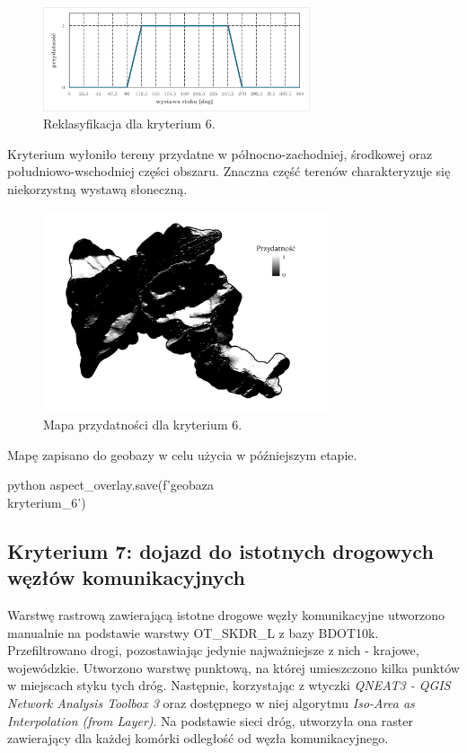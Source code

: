 \documentclass{article}
\begin{document}
\begin{figure}[H]
    \centering
    \includegraphics[width=0.7\textwidth]{img/kryterium6-wykres-glowny.png}
    \caption{Reklasyfikacja dla kryterium 6.}
\end{figure}
\vspace{10pt}

Kryterium wyłoniło tereny przydatne w północno-zachodniej, środkowej oraz południowo-wschodniej części obszaru. Znaczna część terenów charakteryzuje się niekorzystną wystawą słoneczną.
\vspace{5pt}

\begin{figure}[H]
    \centering
    \includegraphics[width=0.75\textwidth]{img/kryterium6-layout.jpg}
    \caption*{Mapa przydatności dla kryterium 6.}
\end{figure}
\vspace{10pt}

Mapę zapisano do geobazy w celu użycia w późniejszym etapie.
\vspace{5pt}

\begin{mintedbox}{python}
aspect_overlay.save(f'{geobaza}\\kryterium_6')
\end{mintedbox}

\newpage
\subsection{Kryterium 7: dojazd do istotnych drogowych węzłów komunikacyjnych}
Warstwę rastrową zawierającą istotne drogowe węzły komunikacyjne utworzono manualnie na podstawie warstwy OT\_SKDR\_L z bazy BDOT10k. Przefiltrowano drogi, pozostawiając jedynie najważniejsze z nich - krajowe, wojewódzkie. Utworzono warstwę punktową, na której umieszczono kilka punktów w miejscach styku tych dróg. Następnie, korzystając z wtyczki \textit{QNEAT3 - QGIS Network Analysis Toolbox 3} oraz dostępnego w niej algorytmu \textit{Iso-Area as Interpolation (from Layer)}. Na podstawie sieci dróg, utworzyła ona raster zawierający dla każdej komórki odległość od węzła komunikacyjnego.
\end{document}
